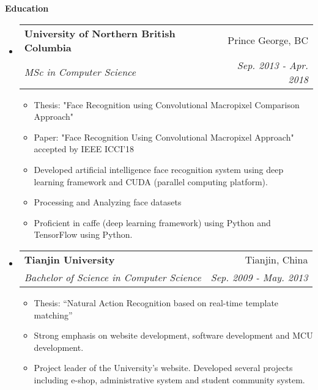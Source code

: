 \documentclass[letterpaper,11pt]{article}
\makeatletter
\newcommand{\resitem}[1]{\item #1 \vspace{-2pt}}
\newcommand{\resheading}[1]{{\large \colorbox{mygrey}{\begin{minipage}{\textwidth}{\textbf{#1 \vphantom{p\^{E}}}}\end{minipage}}}}
\newcommand{\ressubheading}[4]{
\begin{tabular*}{7.0in}{l@{\extracolsep{\fill}}r}
		\textbf{#1} & #2 \\
		\textit{#3} & \textit{#4} \\
\end{tabular*}\vspace{-6pt}}
\makeatother
\begin{document}
\resheading{Education}
\begin{itemize}
\item
	\ressubheading{University of Northern British Columbia}{Prince George, BC}{MSc in Computer Science}{Sep. 2013 - Apr. 2018}
	\begin{itemize}
		\resitem{Thesis: "Face Recognition using Convolutional Macropixel Comparison Approach"}
		\resitem{Paper: "Face Recognition Using Convolutional Macropixel Approach" accepted by IEEE ICCI'18}
		\resitem{Developed artificial intelligence face recognition system using deep learning framework and CUDA (parallel computing platform).}
		\resitem{Processing and Analyzing face datasets}
		\resitem{Proficient in caffe (deep learning framework) using Python and TensorFlow using Python.}
	\end{itemize}
	
\item
	\ressubheading{Tianjin University}{Tianjin, China}{Bachelor of Science in Computer Science}{Sep. 2009 - May. 2013}
	\begin{itemize}
		\resitem{Thesis: “Natural Action Recognition based on real-time template matching”}
		\resitem{Strong emphasis on website development, software development and MCU development.}
		\resitem{Project leader of the University’s website. Developed several projects including e-shop, administrative system and student community system.}
	\end{itemize}

\end{itemize}
\end{document}
